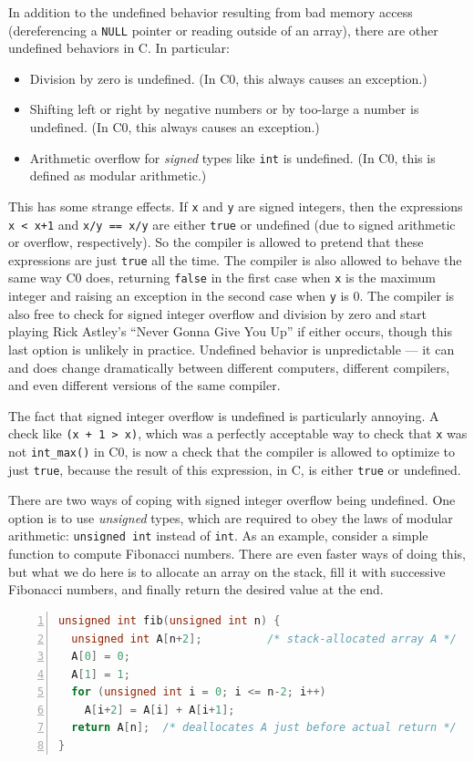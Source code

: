 In addition to the undefined behavior resulting from bad memory access
(dereferencing a \lstinline'NULL' pointer or reading outside of an array),
there are other undefined behaviors in C. In particular:
\begin{itemize}
\item%
  Division by zero is undefined. (In C0, this always causes an exception.)
\item%
  Shifting left or right by negative numbers or by too-large a number is
  undefined. (In C0, this always causes an exception.)
\item%
  Arithmetic overflow for \emph{signed} types like \lstinline'int' is
  undefined. (In C0, this is defined as modular arithmetic.)
\end{itemize}

This has some strange effects. If \lstinline'x' and \lstinline'y' are signed
integers, then the expressions \lstinline'x < x+1' and \lstinline'x/y == x/y'
are either \lstinline'true' or undefined (due to signed arithmetic or
overflow, respectively).  So the compiler is allowed to pretend that
these expressions are just \lstinline'true' all the time. The compiler is
also allowed to behave the same way C0 does, returning \lstinline'false' in
the first case when \lstinline'x' is the maximum integer and raising an
exception in the second case when \lstinline'y' is 0. The compiler is also
free to check for signed integer overflow and division by zero and
start playing Rick Astley's ``Never Gonna Give You Up'' if either
occurs, though this last option is unlikely in practice.  Undefined
behavior is unpredictable --- it can and does change dramatically
between different computers, different compilers, and even different
versions of the same compiler.

The fact that signed integer overflow is undefined is particularly
annoying. A check like \lstinline'(x + 1 > x)', which was a perfectly
acceptable way to check that \lstinline'x' was not \lstinline'int_max()'
in C0, is now a check that the compiler is allowed to optimize to just
\lstinline'true', because the result of this expression, in C, is
either \lstinline'true' or undefined.

There are two ways of coping with signed integer overflow being
undefined. One option is to use \emph{unsigned} types, which are
required to obey the laws of modular arithmetic: \lstinline'unsigned int'
instead of \lstinline'int'.  As an example, consider a simple function to
compute Fibonacci numbers.  There are even faster ways of doing this,
but what we do here is to allocate an array on the stack, fill it with
successive Fibonacci numbers, and finally return the desired value at
the end.
\begin{lstlisting}[language=c, numbers=left]
unsigned int fib(unsigned int n) {
  unsigned int A[n+2];			/* stack-allocated array A */
  A[0] = 0;
  A[1] = 1;
  for (unsigned int i = 0; i <= n-2; i++)
    A[i+2] = A[i] + A[i+1];
  return A[n];  /* deallocates A just before actual return */
}
\end{lstlisting}


